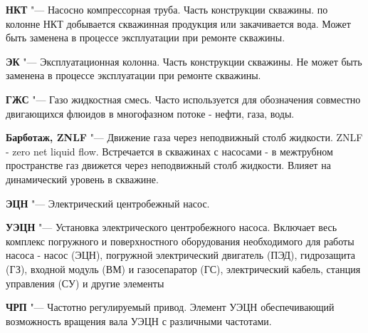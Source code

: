 \textbf{НКТ} "--- Насосно компрессорная труба. Часть конструкции скважины. по колонне НКТ добывается скважинная продукция или закачивается вода. Может быть заменена в процессе эксплуатации при ремонте скважины. 

\textbf{ЭК} "--- Эксплуатационная колонна. Часть конструкции скважины.  Не может быть заменена в процессе эксплуатации при ремонте скважины. 

\textbf{ГЖС} "--- Газо жидкостная смесь. Часто используется для обозначения совместно двигающихся флюидов в многофазном потоке - нефти, газа, воды.

\textbf{Барботаж, ZNLF} "--- Движение газа через неподвижный столб жидкости. ZNLF - zero net liquid flow. Встречается в скважинах с насосами - в межтрубном пространстве газ движется через неподвижный столб жидкости. Влияет на динамический уровень в скважине.

\textbf{ЭЦН} "--- Электрический центробежный насос.

\textbf{УЭЦН} "--- Установка электрического центробежного насоса. Включает весь комплекс погружного и поверхностного оборудования необходимого для работы насоса - насос (ЭЦН), погружной электрический двигатель (ПЭД), гидрозащита (ГЗ), входной модуль (ВМ) и газосепаратор (ГС), электрический кабель, станция управления (СУ) и другие элементы

\textbf{ЧРП} "--- Частотно регулируемый привод. Элемент УЭЦН обеспечивающий возможность вращения вала УЭЦН с различными частотами.